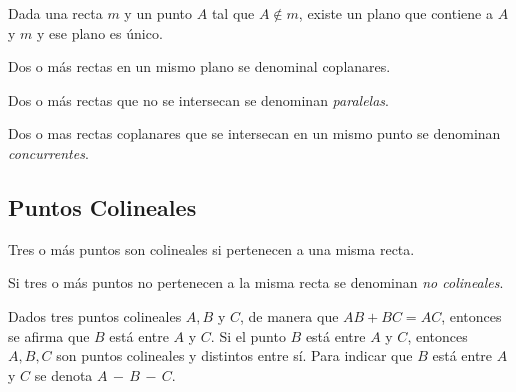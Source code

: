 \clearpage

\begin{theorem}
    Dada una recta $m$ y un punto $A$ tal que $A \not \in m$, existe un plano que contiene a $A$ y $m$ y ese plano es único.

    
    \begin{figure}[!h]
        \centering
        
        \label{fig:theorem1}
    \end{figure}
        
\end{theorem}

\begin{definition}
Dos o más rectas en un mismo plano se denominal coplanares.
\end{definition}

\begin{definition}
Dos o más rectas que no se intersecan se denominan \textit{paralelas}.
\end{definition}

\begin{definition}
Dos o mas rectas coplanares que se intersecan en un mismo punto se denominan \textit{concurrentes}.
\end{definition}

\clearpage

\subsection{Puntos Colineales}

\begin{definition}
Tres o más puntos son colineales si pertenecen a una misma recta.
\end{definition}

\begin{definition}
Si tres o más puntos no pertenecen a la misma recta se denominan \textit{no colineales}.
\end{definition}

\begin{postulate}
    Dados tres puntos colineales $A,B$ y $C$, de manera que $AB + BC = AC$, entonces se afirma que $B$ está entre $A$ y $C$.  Si el punto $B$ está entre $A$ y $C$, entonces $A,B,C$ son puntos colineales y distintos entre sí. Para indicar que $B$ está entre $A$ y $C$ se denota $A\,-\,B\,-\,C$.
    
    \begin{figure}[!h]
        \centering
        
        \label{fig:postulate10}
    \end{figure}
\end{postulate}

